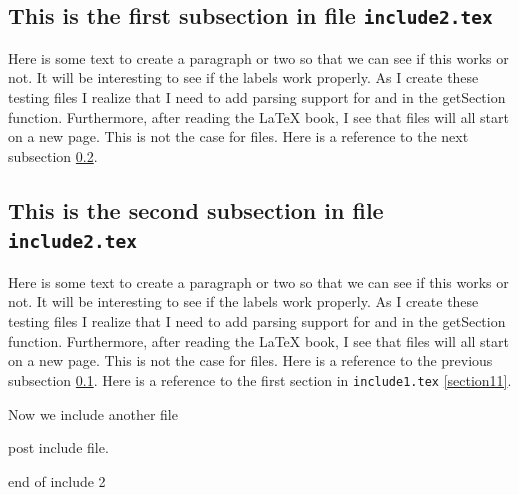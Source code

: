﻿\subsection{This is the first subsection in file \texttt{include2.tex}}
\label{section21}

Here is some text to create a paragraph or two so that we
can see if this works or not.  It will be interesting to see
if the labels work properly.  As I create these testing files
I realize that I need to add parsing support for \verb##
and \verb## in the getSection function.   Furthermore,
after reading the \LaTeX{} book, I see that \verb## 
files will all start on a new page.  This is not the case for
\verb## files.  Here is a reference to the next subsection \ref{section22}.

\subsection{This is the second subsection in file \texttt{include2.tex}}
\label{section22}

Here is some text to create a paragraph or two so that we
can see if this works or not.  It will be interesting to see
if the labels work properly.  As I create these testing files
I realize that I need to add parsing support for \verb##
and \verb## in the getSection function.   Furthermore,
after reading the \LaTeX{} book, I see that \verb## 
files will all start on a new page.  This is not the case for
\verb## files.  Here is a reference to the previous subsection \ref{section21}.
Here is a reference to the first section in \texttt{include1.tex}
\ref{section11}.

Now we include another file

post include file.

end of include 2
